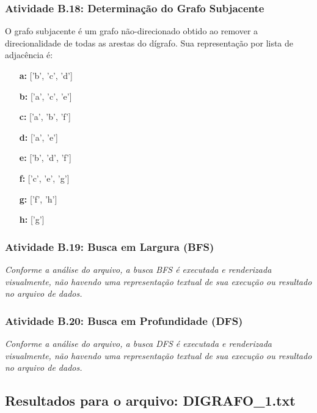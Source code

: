 \documentclass[a4paper,12pt]{article}
\begin{document}
\subsubsection*{Atividade B.18: Determinação do Grafo Subjacente}
O grafo subjacente é um grafo não-direcionado obtido ao remover a direcionalidade de todas as arestas do dígrafo. Sua representação por lista de adjacência é:
\begin{itemize}[leftmargin=*]
    \item[\textbf{a:}] ['b', 'c', 'd']
    \item[\textbf{b:}] ['a', 'c', 'e']
    \item[\textbf{c:}] ['a', 'b', 'f']
    \item[\textbf{d:}] ['a', 'e']
    \item[\textbf{e:}] ['b', 'd', 'f']
    \item[\textbf{f:}] ['c', 'e', 'g']
    \item[\textbf{g:}] ['f', 'h']
    \item[\textbf{h:}] ['g']
\end{itemize}

\subsubsection*{Atividade B.19: Busca em Largura (BFS)}
\textit{Conforme a análise do arquivo, a busca BFS é executada e renderizada visualmente, não havendo uma representação textual de sua execução ou resultado no arquivo de dados.}

\subsubsection*{Atividade B.20: Busca em Profundidade (DFS)}
\textit{Conforme a análise do arquivo, a busca DFS é executada e renderizada visualmente, não havendo uma representação textual de sua execução ou resultado no arquivo de dados.}
\\
\subsection{Resultados para o arquivo: DIGRAFO\_1.txt}
\end{document}
